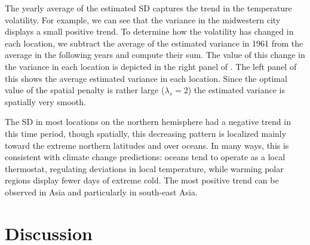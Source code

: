 \documentclass[letterpaper]{article} %
\newcommand{\autoref}{\Cref}
\begin{document}
The yearly average of the estimated SD captures the trend in the
temperature volatility. For example, we can see that the variance in
the midwestern city displays a small positive trend. To determine how the volatility has
changed in each location, we subtract the average of the estimated
variance in 1961 from the average in the following years and compute
their sum. The value of this change in the variance in each location
is depicted in the right panel of
\autoref{fig:avg_chg}. The left panel of this
shows the average estimated variance in each location. Since the
optimal value of the spatial penalty is rather large ($\lambda_s=2$)
the estimated variance is spatially very smooth. 

The SD in most locations on the northern
hemisphere had a negative trend in this time period, though spatially,
this decreasing pattern is localized mainly toward the extreme
northern latitudes and over oceans. In many ways, this is consistent
with climate change predictions: oceans tend to operate as a local
thermostat, regulating deviations in local temperature, while warming polar
regions display fewer days of extreme cold.
The most positive trend can be observed in Asia and
particularly in south-east Asia. 





 

\section{Discussion}
\label{sec:discussion}
\end{document}
